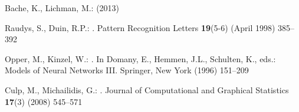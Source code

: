 \documentclass[smallcondensed]{svjour3}
\begin{document}
\begin{thebibliography}{10}
Bache, K., Lichman, M.:
 (2013)

Raudys, S., Duin, R.P.:
.
\newblock Pattern Recognition Letters \textbf{19}(5-6) (April 1998)  385--392

Opper, M., Kinzel, W.:
.
\newblock In Domany, E., Hemmen, J.L., Schulten, K., eds.: Models of Neural
  Networks III.
\newblock Springer, New York (1996)  151--209

Culp, M., Michailidis, G.:
.
\newblock Journal of Computational and Graphical Statistics \textbf{17}(3)
  (2008)  545--571

\end{thebibliography}
\end{document}
